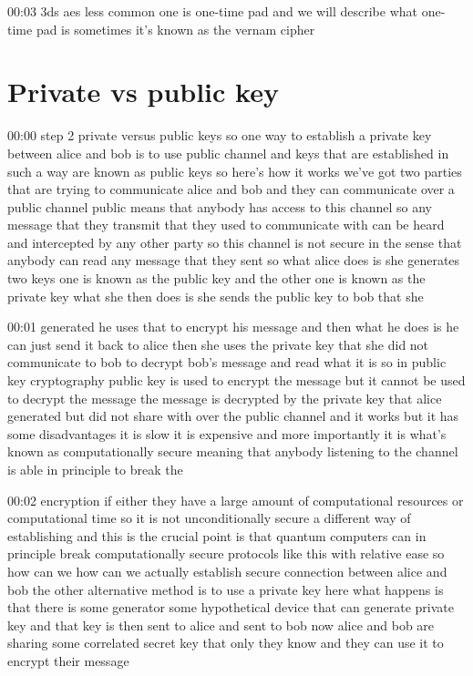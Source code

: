 00:03
3ds aes less common one is one-time pad and we will describe what one-time pad
is sometimes it's known as the vernam cipher

\section{Private vs public key}


00:00
step 2 private versus public keys so one way to establish a private key
between alice and bob is to use public channel
and keys that are established in such a way are known as public keys
so here's how it works we've got two parties that are trying to communicate
alice and bob and they can communicate over a public channel
public means that anybody has access to this channel so any message that they
transmit that they used to communicate with can be heard and intercepted
by any other party so this channel is not secure in the sense that anybody
can read any message that they sent so what alice does is she generates two
keys one is known as the public key and the other one is known as the
private key what she then does is she sends the public key to bob that she

00:01
generated he uses that to encrypt his message and then what he does is he
can just send it back to alice then she uses the private key
that she did not communicate to bob to decrypt bob's message
and read what it is so in public key cryptography
public key is used to encrypt the message but it cannot be used to decrypt the
message the message is decrypted by the private key that alice
generated but did not share with over the public channel
and it works but it has some disadvantages it is slow it is expensive and more
importantly it is what's known as computationally secure
meaning that anybody listening to the channel is able in principle to break the

00:02
encryption if either they have a large amount of computational resources
or computational time so it is not unconditionally secure
a different way of establishing and this is the crucial point is that
quantum computers can in principle break computationally
secure protocols like this with relative ease so how can we how can we actually
establish secure connection between alice and bob
the other alternative method is to use a private key
here what happens is that there is some generator some hypothetical device that
can generate private key and that key is then sent to alice and sent to bob
now alice and bob are sharing some correlated secret key that only they know
and they can use it to encrypt their message

